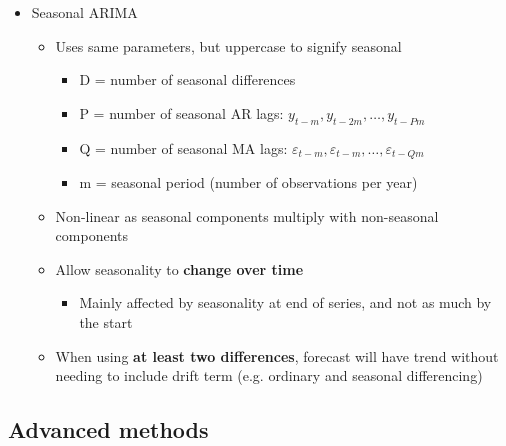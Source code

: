 \documentclass{article}\usepackage[]{graphicx}\usepackage[]{color}
\begin{document}
\begin{itemize}
\begin{itemize}
\begin{itemize}
        \end{itemize}
    \end{itemize}
    \item Seasonal ARIMA
    \begin{itemize}
        \item Uses same parameters, but uppercase to signify seasonal
        \begin{itemize}
            \item D = number of seasonal differences
            \item P = number of seasonal AR lags: $y_{t-m}, y_{t-2m}, \ldots, y_{t-Pm}$
            \item Q = number of seasonal MA lags: $\varepsilon_{t-m}, \varepsilon_{t-m}, \ldots, \varepsilon_{t-Qm}$
            \item m = seasonal period (number of observations per year)
        \end{itemize}
        \item Non-linear as seasonal components multiply with non-seasonal components
        \item Allow seasonality to \textbf{change over time}
        \begin{itemize}
            \item Mainly affected by seasonality at end of series, and not as much by the start
        \end{itemize}
        \item When using \textbf{at least two differences}, forecast will have trend without needing to include drift term (e.g. ordinary and seasonal differencing)
    \end{itemize}
\end{itemize}

\subsection{Advanced methods}
\end{document}
